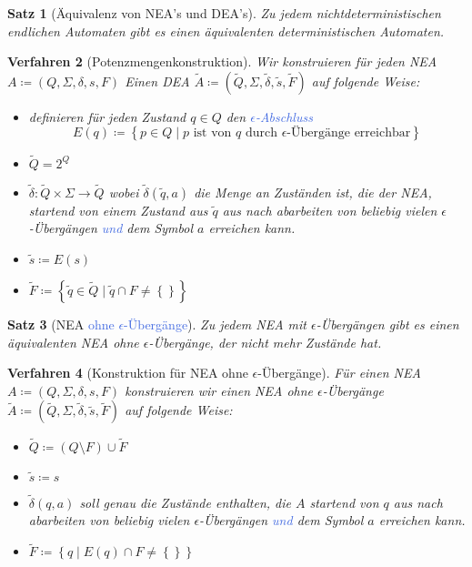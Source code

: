 \documentclass[11pt]{article}
\newcommand{\tcol}[1]{\textcolor{RoyalBlue}{#1}}
\newcommand{\set}[1]{\left\lbrace #1\right\rbrace}
\theoremstyle{break}
\newtheorem{satz}{Satz}[section]
\newtheorem{verf}[satz]{Verfahren}
\begin{document}
    \begin{satz}[Äquivalenz von NEA's und DEA's]
        Zu jedem nichtdeterministischen endlichen Automaten gibt es einen äquivalenten deterministischen Automaten.
    \end{satz}

    \begin{verf}[Potenzmengenkonstruktion]
        Wir konstruieren für jeden NEA $A\coloneqq (Q,\Sigma ,\delta ,s,F)$ Einen DEA $\tilde{A}\coloneqq (\tilde{Q},\Sigma ,\tilde{\delta},\tilde{s},\tilde{F})$ auf folgende Weise:
        \begin{itemize}
            \item definieren für jeden Zustand $q\in Q$ den \tcol{$\epsilon$-Abschluss} \[E(q)\coloneqq \set{p\in Q\mid p \text{ ist von } q \text{ durch } \epsilon\text{-Übergänge erreichbar}}\]
            \item $\tilde{Q} = 2^Q$
            \item $\tilde{\delta}\colon\tilde{Q}\times\Sigma\to\tilde{Q}$ wobei $\tilde{\delta}(\tilde{q},a)$ die Menge an Zuständen ist, die der NEA, startend von einem Zustand aus $\tilde{q}$ aus nach abarbeiten von beliebig vielen $\epsilon$-Übergängen \tcol{und} dem Symbol $a$ erreichen kann.
            \item $\tilde{s}\coloneqq E(s)$
            \item $\tilde{F}\coloneqq \set{\tilde{q}\in\tilde{Q}\mid\tilde{q}\cap F\neq\set{}}$
        \end{itemize}
    \end{verf}

    \begin{satz}[NEA \tcol{ohne $\epsilon$-Übergänge}]
        Zu jedem NEA mit $\epsilon$-Übergängen gibt es einen äquivalenten NEA ohne $\epsilon$-Übergänge, der nicht mehr Zustände hat.
    \end{satz}

    \begin{verf}[Konstruktion für NEA ohne $\epsilon$-Übergänge]
        Für einen NEA $A\coloneqq (Q,\Sigma ,\delta ,s,F)$ konstruieren wir einen NEA ohne $\epsilon$-Übergänge $\tilde{A}\coloneqq (\tilde{Q},\Sigma ,\tilde{\delta},\tilde{s},\tilde{F})$ auf folgende Weise:
        \begin{itemize}
            \item $\tilde{Q}\coloneqq (Q\setminus F)\cup\tilde{F}$
            \item $\tilde{s}\coloneqq s$
            \item $\tilde{\delta}(q,a)$ soll genau die Zustände enthalten, die $A$ startend von $q$ aus nach abarbeiten von beliebig vielen $\epsilon$-Übergängen \tcol{und} dem Symbol $a$ erreichen kann.
            \item $\tilde{F}\coloneqq\set{q\mid E(q)\cap F\neq\set{}}$
        \end{itemize}
    \end{verf}
\end{document}
